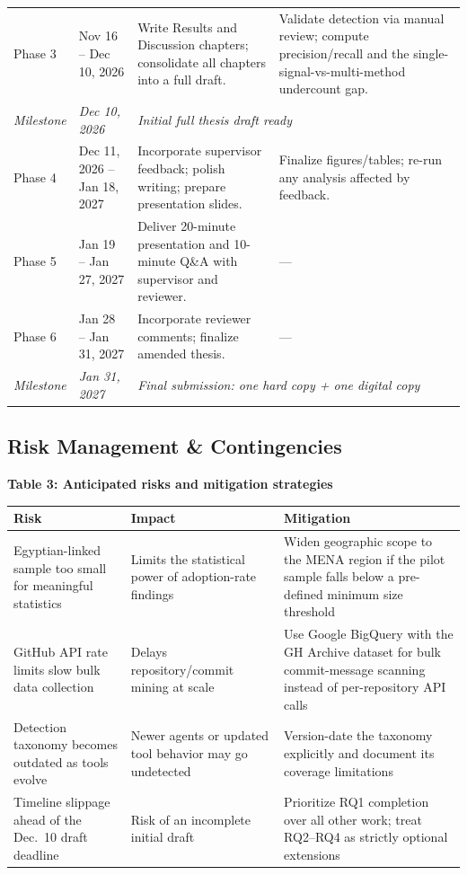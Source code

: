 \documentclass[11pt,a4paper]{article}
\begin{document}
\begin{center}
\begin{tabularx}{\textwidth}{@{}l l X X@{}}
Phase 3 &
Nov 16 -- Dec 10, 2026 &
Write Results and Discussion chapters; consolidate all chapters into a full draft. &
Validate detection via manual review; compute precision/recall and the single-signal-vs-multi-method undercount gap. \\
\addlinespace
\textit{Milestone} & \textit{Dec 10, 2026} & \multicolumn{2}{l}{\textit{Initial full thesis draft ready}} \\
\addlinespace
Phase 4 &
Dec 11, 2026 -- Jan 18, 2027 &
Incorporate supervisor feedback; polish writing; prepare presentation slides. &
Finalize figures/tables; re-run any analysis affected by feedback. \\
\addlinespace
Phase 5 &
Jan 19 -- Jan 27, 2027 &
Deliver 20-minute presentation and 10-minute Q\&A with supervisor and reviewer. &
--- \\
\addlinespace
Phase 6 &
Jan 28 -- Jan 31, 2027 &
Incorporate reviewer comments; finalize amended thesis. &
--- \\
\addlinespace
\textit{Milestone} & \textit{Jan 31, 2027} & \multicolumn{2}{l}{\textit{Final submission: one hard copy + one digital copy}} \\
\bottomrule
\end{tabularx}
\end{center}

\newpage

\subsection{Risk Management \& Contingencies}

\begin{center}
\textbf{Table 3: Anticipated risks and mitigation strategies}\label{tab:risks}\\[4pt]
\begin{tabularx}{\textwidth}{@{}p{4.5cm}Xp{4.5cm}@{}}
\toprule
\textbf{Risk} & \textbf{Impact} & \textbf{Mitigation} \\
\midrule
Egyptian-linked sample too small for meaningful statistics & Limits the statistical power of adoption-rate findings & Widen geographic scope to the MENA region if the pilot sample falls below a pre-defined minimum size threshold \\
\addlinespace
GitHub API rate limits slow bulk data collection & Delays repository/commit mining at scale & Use Google BigQuery with the GH Archive dataset for bulk commit-message scanning instead of per-repository API calls \\
\addlinespace
Detection taxonomy becomes outdated as tools evolve & Newer agents or updated tool behavior may go undetected & Version-date the taxonomy explicitly and document its coverage limitations \\
\addlinespace
Timeline slippage ahead of the Dec.\ 10 draft deadline & Risk of an incomplete initial draft & Prioritize RQ1 completion over all other work; treat RQ2--RQ4 as strictly optional extensions \\
\bottomrule
\end{tabularx}
\end{center}
\end{document}
